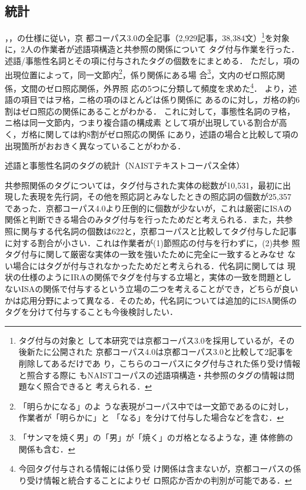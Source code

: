 \documentclass[japanese]{jnlp_1.4}
\def\ssec#1{}
\def\tab#1{}
\begin{document}
\subsection{統計}

\ssec{spec_pred}，\ssec{spec_event}，\ssec{spec_coref}の仕様に従い，京
都コーパス3.0の全記事（2,929記事，38,384文）\footnote{タグ付与の対象と
  して本研究では京都コーパス3.0を採用しているが，その後新たに公開された
  京都コーパス4.0は京都コーパス3.0と比較して2記事を削除してあるだけであ
  り，こちらのコーパスにタグ付与された係り受け情報と照合する際に
  もNAISTコーパスの述語項構造・共参照のタグの情報は問題なく照合できると
  考えられる．}を対象に，2人の作業者が述語項構造と共参照の関係について
タグ付与作業を行った．
述語/事態性名詞とその項に付与されたタグの個数を\tab{statics}にまとめる．
ただし，項の出現位置によって，同一文節内\footnote{「明らかになる」のよ
  うな表現がコーパス中では一文節であるのに対し，作業者が「明らかに」と
  「なる」を分けて付与した場合などを含む．}，係り関係にある場
合\footnote{「サンマを焼く男」の「男」が「焼く」のガ格となるような，連
  体修飾の関係も含む．}，文内のゼロ照応関係，文間のゼロ照応関係，外界照
応の5つに分類して頻度を求めた\footnote{今回タグ付与される情報には係り受
  け関係は含まないが，京都コーパスの係り受け情報と統合することによりゼ
  ロ照応か否かの判別が可能である．}．
\tab{statics}より，述語の項目ではヲ格，ニ格の項のほとんどは係り関係に
あるのに対し，ガ格の約6割はゼロ照応の関係にあることがわかる．
これに対して，事態性名詞のヲ格，ニ格は同一文節内，つまり複合語の構成素
として項が出現している割合が高く，ガ格に関しては約8割がゼロ照応の関係
にあり，述語の場合と比較して項の出現箇所がおおきく異なっていることがわかる．

\begin{table}[t]
  \caption{述語と事態性名詞のタグの統計（NAISTテキストコーパス全体）}
  \label{tab:statics}

\end{table}


共参照関係のタグについては，タグ付与された実体の総数が10,531，最初に出
現した表現を先行詞，その他を照応詞とみなしたときの照応詞の個数が25,357
であった．京都コーパス4.0より圧倒的に個数が少ないが，これは厳密にISAの
関係と判断できる場合のみタグ付与を行ったためだと考えられる．また，共参
照に関与する代名詞の個数は622と，京都コーパスと比較してタグ付与した記事
に対する割合が小さい．これは作業者が(1)節照応の付与を行わずに，(2)共参
照タグ付与に関して厳密な実体の一致を強いたために完全に一致するとみなせ
ない場合にはタグが付与されなかったためだと考えられる．代名詞に関しては
現状の仕様のようにIRAの関係でタグを付与する立場と，実体の一致を問題とし
ないISAの関係で付与するという立場の二つを考えることができ，どちらが良い
かは応用分野によって異なる．そのため，代名詞については追加的にISA関係の
タグを分けて付与することも今後検討したい．
\end{document}
